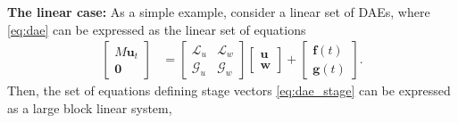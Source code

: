 \documentclass[a4paper,10pt]{article}
\begin{document}
\textbf{The linear case:} As a simple example, consider a
linear set of DAEs, where \eqref{eq:dae} can be expressed as the linear set of
equations
%
\begin{align}\label{eq:dae_lin}
\begin{bmatrix} M\mathbf{u}_t \\ \mathbf{0} \end{bmatrix}
& = \begin{bmatrix} \mathcal{L}_u & \mathcal{L}_w \\
	\mathcal{G}_u & \mathcal{G}_w\end{bmatrix}
	\begin{bmatrix} \mathbf{u} \\ \mathbf{w} \end{bmatrix} + 
		\begin{bmatrix}\mathbf{f}(t) \\ \mathbf{g}(t)\end{bmatrix}.
\end{align}
%
Then, the set of equations defining stage vectors \eqref{eq:dae_stage} can
be expressed as a large block linear system,
%
\end{document}
